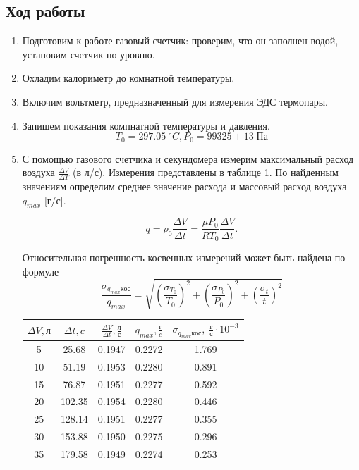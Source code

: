 \documentclass[a4paper,12pt]{article}
\begin{document}
	\subsection{Ход работы}
	\begin{enumerate}
		\item Подготовим к работе газовый счетчик: проверим, что он заполнен  водой, установим счетчик по уровню.
		\item Охладим калориметр до комнатной температуры.
		\item Включим вольтметр, предназначенный для измерения ЭДС термопары. 
		\item Запишем показания компнатной температуры и давления. $$T_{0} = 297.05 \; ^\circ C, P_{0} = 99325 \pm 13 \; {Па} $$
		\item С помощью газового счетчика и секундомера измерим максимальный расход воздуха $\frac{\Delta V}{\Delta T}$ (в л/с). Измерения представлены в таблице 1. По найденным значениям определим среднее значение расхода и массовый расход воздуха $q_{max}$ [г/с].
		
		$$q = \rho_0 \frac{\Delta V}{\Delta t} = \frac{\mu P_0}{RT_0} \frac{\Delta V}{\Delta t}.$$
		
		Относительная погрешность косвенных измерений может быть найдена по формуле $$\frac{\sigma_{q_{max}кос}}{q_{max}} = \sqrt{(\frac{\sigma_{T_0}}{T_{0}})^2+(\frac{\sigma_{P_0}}{P_{0}})^2+ (\frac{\sigma_t}{t})^2}$$ 


	\begin{table}
	\begin{center}
	\begin{tabular}{|c|c|c|c|c|}
				\hline
				$\Delta V, л$ & $\Delta t, c$ & $\frac{\Delta V}{\Delta t},\frac{л}{с}$ & $q_{max},\frac{г}{c} $ & $\sigma_{q_{max}кос}, \; \frac{г}{с} \cdot 10^{-3}$ \\
				\hline
				5 & 25.68 & 0.1947 & 0.2272 & 1.769 \\
				\hline
				10 & 51.19 & 0.1953 & 0.2280 & 0.891\\
				\hline
				15 & 76.87 &  0.1951 & 0.2277 & 0.592\\
				\hline
				20 & 102.35 & 0.1954 & 0.2280 &0.446 \\
				\hline
				25 & 128.14 & 0.1951 & 0.2277 & 0.355\\
				\hline
				30 & 153.88 & 0.1950 & 0.2275 & 0.296 \\
				\hline
				35 & 179.58 & 0.1949 &0.2274 & 0.253 \\
				\hline
	

\end{tabular}
\end{center}
\end{table}
\end{enumerate}
\end{document}
